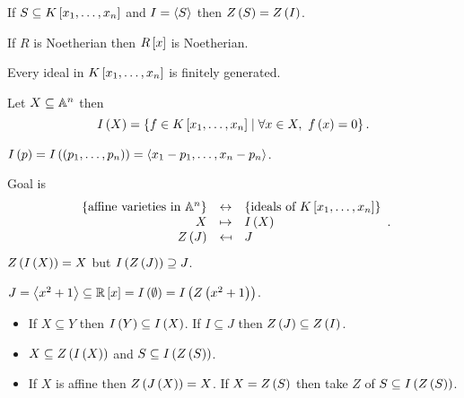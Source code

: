 \begin{remark}
If $ S \subseteq K\sb{x_1, \dots, x_n} $ and $ I = \ab{S} $ then $ Z\rb{S} = Z\rb{I} $.
\end{remark}

\begin{theorem}
If $ R $ is Noetherian then $ R\sb{x} $ is Noetherian.
\end{theorem}

\begin{corollary}
Every ideal in $ K\sb{x_1, \dots, x_n} $ is finitely generated.
\end{corollary}

\begin{definition}
Let $ X \subseteq \A^n $ then
$$ I\rb{X} = \cb{f \in K\sb{x_1, \dots, x_n} \mid \forall x \in X, \ f\rb{x} = 0}. $$
\end{definition}

\begin{example}
$ I\rb{p} = I\rb{\rb{p_1, \dots, p_n}} = \ab{x_1 - p_1, \dots, x_n - p_n} $.
\end{example}

Goal is
$$
\begin{array}{rcl}
\cb{\text{affine varieties in} \ \A^n} & \leftrightarrow & \cb{\text{ideals of} \ K\sb{x_1, \dots, x_n}} \\
X & \mapsto & I\rb{X} \\
Z\rb{J} & \mapsfrom & J
\end{array}.
$$
$ Z\rb{I\rb{X}} = X $ but $ I\rb{Z\rb{J}} \supseteq J $.

\begin{example}
$ J = \ab{x^2 + 1} \subseteq \R\sb{x} = I\rb{\emptyset} = I\rb{Z\rb{x^2 + 1}} $.
\end{example}

\begin{proposition}
\hfill
\begin{itemize}
\item If $ X \subseteq Y $ then $ I\rb{Y} \subseteq I\rb{X} $. If $ I \subseteq J $ then $ Z\rb{J} \subseteq Z\rb{I} $.
\item $ X \subseteq Z\rb{I\rb{X}} $ and $ S \subseteq I\rb{Z\rb{S}} $.
\item If $ X $ is affine then $ Z\rb{J\rb{X}} = X $. If $ X = Z\rb{S} $ then take $ Z $ of $ S \subseteq I\rb{Z\rb{S}} $.
\end{itemize}
\end{proposition}

\pagebreak

